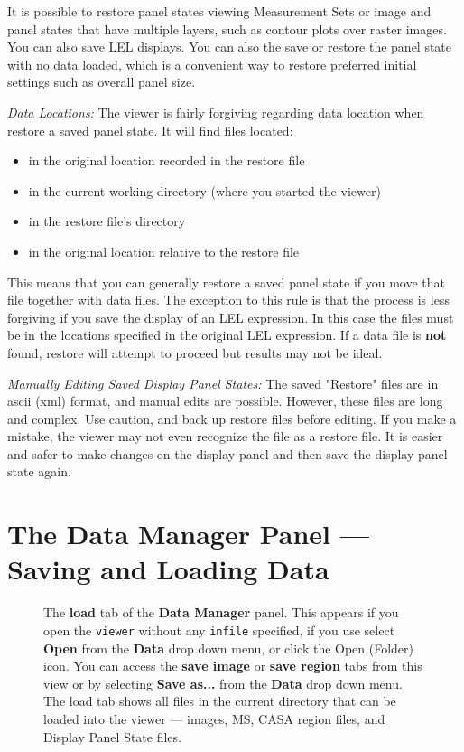 It is possible to restore panel states viewing Measurement Sets or image and
panel states that have multiple layers, such as
contour plots over raster images. You can also save LEL displays. 
You can also the save or restore the panel state with no data loaded, which is a
convenient way to restore preferred initial settings such as overall panel size.

{\em Data Locations:} The viewer is fairly forgiving regarding data location when restore a saved panel state.
It will find files located:
\begin{itemize}
  \item in the original location recorded in the restore file
  \item in the current working directory (where you started the viewer)
  \item in the restore file's directory
  \item in the original location relative to the restore file
\end{itemize}
This means that you can generally restore a saved panel state if you move that
file together with data files. The exception to this rule is that the process is less forgiving
if you save the display of an LEL expression. In this case the files must be in the locations 
specified in the original LEL expression.  If a data file is {\bf not} found, restore
will attempt to proceed but results may not be ideal. 

{\em Manually Editing Saved Display Panel States:} The saved "Restore" files are in ascii 
(xml) format, and manual edits are possible. However, these files are long and complex.  Use caution, and back 
up restore files before editing. If you make a mistake, the viewer may not  even recognize the file as a restore file.  
It is easier and safer to make changes on the display panel and then save the display panel state again.


\section{The Data Manager Panel --- Saving and Loading Data}
\label{section:display.dataManager}

\begin{figure}[h!]
\begin{center}
\caption{\label{fig:viewer_load} The {\bf load} tab of the {\bf Data Manager} panel.
This appears if you open the {\tt viewer} without any {\tt infile} 
specified, if you use select {\bf Open} from the {\bf Data} drop down menu, or click the
Open (Folder) icon. You can access the {\bf save image} or {\bf save region} tabs
from this view or by selecting {\bf Save as...} from the {\bf Data} drop down menu.
The load tab shows all files in the current directory that can be loaded into the viewer 
--- images, MS, CASA region files, and Display Panel State files.}
\end{center}
\hrulefill
\end{figure}

